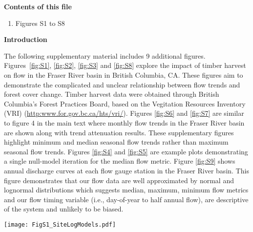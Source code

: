 \documentclass[grl]{agutexSI}
\begin{document}
\begin{article}


\noindent\textbf{Contents of this file}

\begin{enumerate}
\item Figures S1 to S8
\end{enumerate}

\clearpage

\noindent\textbf{Introduction}

	The following supplementary material includes 9 additional figures. Figures~\ref{fig:S1}, \ref{fig:S2}, \ref{fig:S3} and \ref{fig:S8} explore the impact of timber harvest on flow in the Fraser River basin in British Columbia, CA. These figures aim to demonstrate the complicated and unclear relationship between flow trends and forest cover change. Timber harvest data were obtained through British Columbia's Forest Practices Board, based on the Vegitation Resources Inventory (VRI) (\url{http:www.for.gov.bc.ca/hts/vri/}). Figures \ref{fig:S6} and \ref{fig:S7} are similar to figure 4 in the main text where monthly flow trends in the Fraser River basin are shown along with trend attenuation results. These supplementary figures highlight minimum and median seasonal flow trends rather than maximum seasonal flow trends. Figures \ref{fig:S4} and \ref{fig:S5} are example plots demonstrating a single null-model iteration for the median flow metric. Figure \ref{fig:S9} shows annual discharge curves at each flow gauge station in the Fraser River basin. This figure demonstrates that our flow data are well approximated by normal and lognormal distributions which suggests median, maximum, minimum flow metrics and our flow timing variable (i.e., day-of-year to half annual flow), are descriptive of the system and unlikely to be biased.

\end{article}
\clearpage

\begin{sidewaysfigure}[h]
	\centering
	\noindent\texttt{[image: FigS1\_SiteLogModels.pdf]}
	\caption{Median annual flow plotted at an annual time step between 1970 and 2007 for 55 flow gauge stations within the Fraser River basin. Points are colored by the percent of the total watershed area harvested in the previous five years. Grey (blue: sites with no harvest) lines indicate the trend in flow over time using a linear model. Light grey around each trend line represents the 95\% confidence interval.}
	\label{fig:S1}
\end{sidewaysfigure}
\end{document}
